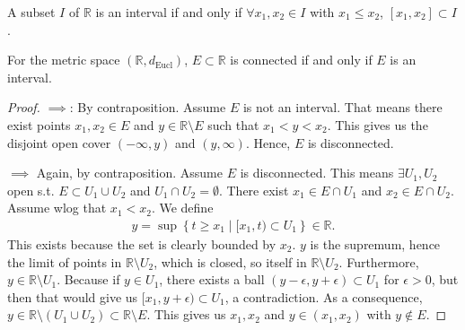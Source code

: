 
\begin{remark}\label{rem:interval_criterion}
	A subset $I$ of $\mathbb{R}$ is an interval if and only if $\forall x_{1},x_{2} \in I$ with $x_{1} \leq x_{2}$, $[x_{1}, x_{2}] \subset I$.
\end{remark}

\begin{prop}\label{prop:connected_subs_RR}
	For the metric space $(\mathbb{R}, d_{\text{Eucl}})$, $E \subset \mathbb{R}$ is connected if and only if $E$ is an interval.
\end{prop}
\begin{proof}
	$\implies$: By contraposition. Assume $E$ is not an interval. That means there exist points $x_{1}, x_{2} \in E$ and $y \in \mathbb{R} \setminus E$ such that $x_{1} < y < x_{2}$. This gives us the disjoint open cover $(-\infty, y)$ and $(y, \infty)$. Hence, $E$ is disconnected.

	$\implies$ Again, by contraposition. Assume $E$ is disconnected. This means $\exists U_{1}, U_{2}$ open s.t. $E \subset U_{1} \cup U_{2}$ and $U_{1} \cap U_{2} = \emptyset$. There exist $x_{1} \in E \cap U_{1}$ and $x_{2} \in E \cap U_{2}$. Assume wlog that $x_{1} < x_{2}$. We define
	\begin{align*}
		y = \sup \left\{ t \geq x_{1} \mid [x_{1},t) \subset U_{1} \right\} \in \mathbb{R}.
	\end{align*}
	This exists because the set is clearly bounded by $x_{2}$. $y$ is the supremum, hence the limit of points in $\mathbb{R} \setminus U_{2}$, which is closed, so itself in $\mathbb{R} \setminus U_{2}$. Furthermore, $y \in \mathbb{R} \setminus U_{1}$. Because if $y \in U_{1}$, there exists a ball $(y - \epsilon, y + \epsilon) \subset U_{1}$ for $\epsilon > 0$, but then that would give us $[x_{1}, y + \epsilon) \subset U_{1}$, a contradiction.
	As a consequence, $y \in \mathbb{R} \setminus (U_{1} \cup U_{2}) \subset \mathbb{R} \setminus E$. This gives us $x_{1}, x_{2}$ and $y \in (x_{1},x_{2})$ with $y \not \in E$.
\end{proof}

